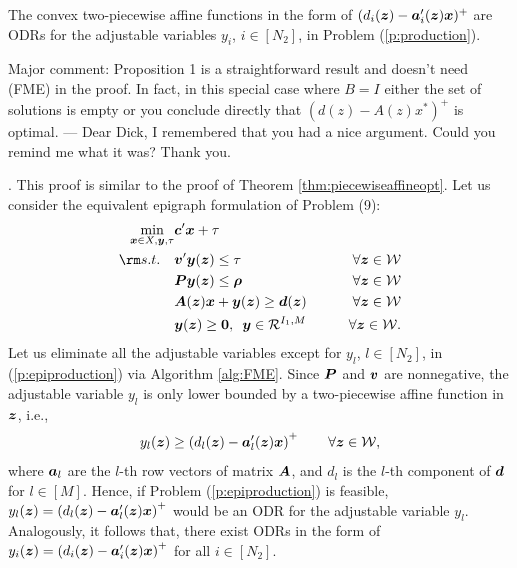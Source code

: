\documentclass[fleqn,mnsc,blindrev]{informs4}
\newcommand{\mb}[1]{\mbox{\boldmath \ensuremath{#1}}}
\begin{document}
	\begin{proposition} \label{prop:2piecewiseaffineopt}
		The convex two-piecewise affine functions in the form of $(d_i(\mb{z})-\mb{a}'_i(\mb{z})\mb{x})^+$ are ODRs for the adjustable variables $y_i$, $i\in [N_2]$, in Problem (\ref{p:production}).
	\end{proposition}
	
	 {Major comment: Proposition 1 is a straightforward result and doesn’t need (FME) in the proof. In fact, in this special case where $B = I$ either the set of solutions is empty or you conclude directly that $(d(z)- A(z)x^*)^+$ is optimal. --- Dear Dick, I remembered that you had a nice argument. Could you remind me what it was? Thank you.}
	
	. This proof is similar to the proof of Theorem \ref{thm:piecewiseaffineopt}. Let us consider the equivalent epigraph formulation of Problem (9):
\begin{equation} \label{p:epiproduction}
		\begin{aligned} 
		\min_{ \boldsymbol{x} \in X,  \boldsymbol{y}, \tau}  &  \mb{c}'\mb{x} +  \tau \\
		{\rm s.t.} \quad  &    \mb{v}'\mb{y}(\mb{z}) \le  \tau \qquad & \forall \mb{z} \in \mathcal{W}\\
		&\mb{P}\mb{y}(\mb{z}) \le \mb{\rho} \qquad & \forall \mb{z} \in \mathcal{W} \\
		& \mb{A}(\mb{z})\mb{x} + \mb{y}(\mb{z}) \ge \mb{d}(\mb{z}) \qquad & \forall \mb{z} \in \mathcal{W} \\
		& \mb{y}(\mb{z}) \ge \mb{0}, \,\,\,  \mb{y} \in \mathcal{R}^{I_1,M} & \forall \mb{z} \in \mathcal{W}.
		\end{aligned}
\end{equation}
	Let us eliminate all the adjustable variables except for $y_{l}$, $l \in [N_2]$, in (\ref{p:epiproduction}) via Algorithm \ref{alg:FME}.  Since $\mb{P}$ and $\mb{v}$ are nonnegative, the adjustable variable $y_{l}$ is only lower bounded by a two-piecewise affine function in $\mb{z}$, i.e.,
\begin{equation*}
	 y_{l}(\mb{z}) \ge \left(d_l(\mb{z})-\mb{a}'_l(\mb{z})\mb{x} \right)^+  \qquad \forall \mb{z} \in \mathcal{W},
\end{equation*}
	where $\mb{a}_l$ are the $l$-th row vectors of matrix $\mb{A}$, and $d_l$ is the $l$-th component of $\mb{d}$ for $l \in [M]$. Hence, if Problem (\ref{p:epiproduction}) is feasible, $y_{l}(\mb{z}) = \left( d_l(\mb{z})-\mb{a}'_l(\mb{z})\mb{x}\right)^+$ would be an ODR for the adjustable variable $y_l$. Analogously, it follows that, there exist ODRs in the form of  $y_{i}(\mb{z})=\left( d_i(\mb{z})-\mb{a}'_i(\mb{z})\mb{x}\right)^+$ for all $i\in [N_2]$. 	 \hfill \Halmos\\
\end{document}
